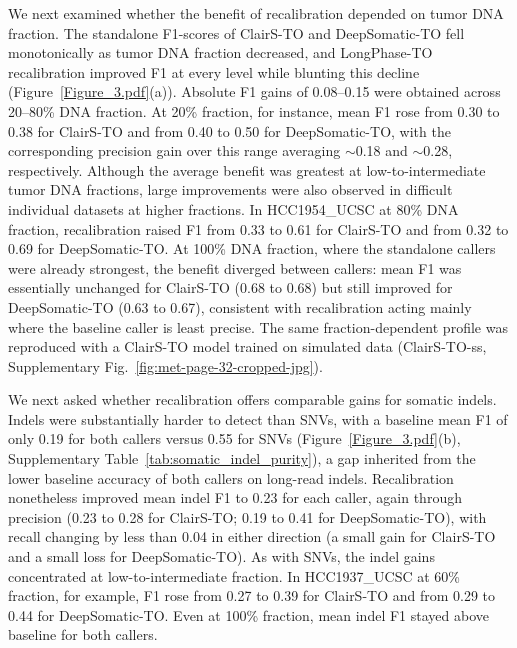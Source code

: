 \documentclass[pdflatex,sn-nature]{sn-jnl}
\begin{document}
We next examined whether the benefit of recalibration depended on tumor DNA fraction. The standalone F1-scores of ClairS-TO and DeepSomatic-TO fell monotonically as tumor DNA fraction decreased, and LongPhase-TO recalibration improved F1 at every level while blunting this decline (Figure~\ref{Figure_3.pdf}(a)). Absolute F1 gains of 0.08--0.15 were obtained across 20--80\% DNA fraction. At 20\% fraction, for instance, mean F1 rose from 0.30 to 0.38 for ClairS-TO and from 0.40 to 0.50 for DeepSomatic-TO, with the corresponding precision gain over this range averaging $\sim$0.18 and $\sim$0.28, respectively. Although the average benefit was greatest at low-to-intermediate tumor DNA fractions, large improvements were also observed in difficult individual datasets at higher fractions. In HCC1954\_UCSC at 80\% DNA fraction, recalibration raised F1 from 0.33 to 0.61 for ClairS-TO and from 0.32 to 0.69 for DeepSomatic-TO. At 100\% DNA fraction, where the standalone callers were already strongest, the benefit diverged between callers: mean F1 was essentially unchanged for ClairS-TO (0.68 to 0.68) but still improved for DeepSomatic-TO (0.63 to 0.67), consistent with recalibration acting mainly where the baseline caller is least precise. The same fraction-dependent profile was reproduced with a ClairS-TO model trained on simulated data (ClairS-TO-ss, Supplementary Fig.~\ref{fig:met-page-32-cropped-jpg}).

We next asked whether recalibration offers comparable gains for somatic indels. Indels were substantially harder to detect than SNVs, with a baseline mean F1 of only 0.19 for both callers versus 0.55 for SNVs (Figure~\ref{Figure_3.pdf}(b), Supplementary Table~\ref{tab:somatic_indel_purity}), a gap inherited from the lower baseline accuracy of both callers on long-read indels. Recalibration nonetheless improved mean indel F1 to 0.23 for each caller, again through precision (0.23 to 0.28 for ClairS-TO; 0.19 to 0.41 for DeepSomatic-TO), with recall changing by less than 0.04 in either direction (a small gain for ClairS-TO and a small loss for DeepSomatic-TO). As with SNVs, the indel gains concentrated at low-to-intermediate fraction. In HCC1937\_UCSC at 60\% fraction, for example, F1 rose from 0.27 to 0.39 for ClairS-TO and from 0.29 to 0.44 for DeepSomatic-TO. Even at 100\% fraction, mean indel F1 stayed above baseline for both callers.
\end{document}

